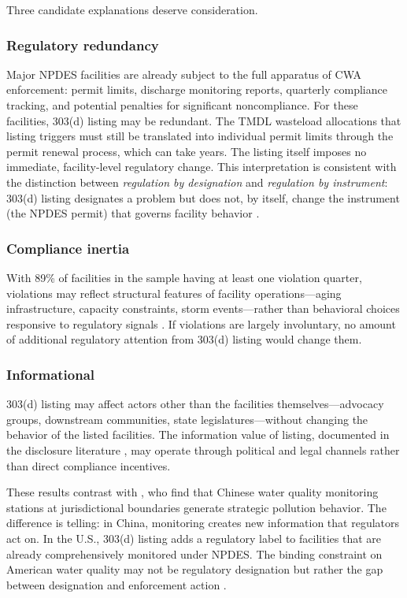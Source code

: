 \documentclass[12pt]{article}
\begin{document}
Three candidate explanations deserve consideration.

\subsubsection*{Regulatory redundancy} Major NPDES facilities are already subject to the full apparatus of CWA enforcement: permit limits, discharge monitoring reports, quarterly compliance tracking, and potential penalties for significant noncompliance. For these facilities, 303(d) listing may be redundant. The TMDL wasteload allocations that listing triggers must still be translated into individual permit limits through the permit renewal process, which can take years. The listing itself imposes no immediate, facility-level regulatory change. This interpretation is consistent with the distinction between \textit{regulation by designation} and \textit{regulation by instrument}: 303(d) listing designates a problem but does not, by itself, change the instrument (the NPDES permit) that governs facility behavior \citep{shimshack2007enforcement}.

\subsubsection*{Compliance inertia} With 89\% of facilities in the sample having at least one violation quarter, violations may reflect structural features of facility operations---aging infrastructure, capacity constraints, storm events---rather than behavioral choices responsive to regulatory signals \citep{gray2011environmental}. If violations are largely involuntary, no amount of additional regulatory attention from 303(d) listing would change them.

\subsubsection*{Informational} 303(d) listing may affect actors other than the facilities themselves---advocacy groups, downstream communities, state legislatures---without changing the behavior of the listed facilities. The information value of listing, documented in the disclosure literature \citep{dranove2003quality, jin2003producer}, may operate through political and legal channels rather than direct compliance incentives.

These results contrast with \citet{he2020watering}, who find that Chinese water quality monitoring stations at jurisdictional boundaries generate strategic pollution behavior. The difference is telling: in China, monitoring creates new information that regulators act on. In the U.S., 303(d) listing adds a regulatory label to facilities that are already comprehensively monitored under NPDES. The binding constraint on American water quality may not be regulatory designation but rather the gap between designation and enforcement action \citep{keiser2019consequences}.
\end{document}

